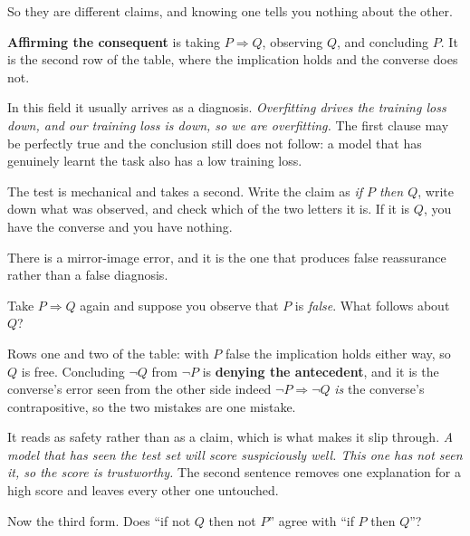 \begin{fr}
So they are different claims, and knowing one tells you nothing about the
other.

\begin{trapbox}
\textbf{Affirming the consequent} is taking $P \Rightarrow Q$, observing $Q$,
and concluding $P$. It is the second row of the table, where the implication
holds and the converse does not.

In this field it usually arrives as a diagnosis. \emph{Overfitting drives the
training loss down, and our training loss is down, so we are overfitting.} The
first clause may be perfectly true and the conclusion still does not follow:
a model that has genuinely learnt the task also has a low training loss.

The test is mechanical and takes a second. Write the claim as
\emph{if $P$ then $Q$}, write down what was observed, and check which of the
two letters it is. If it is $Q$, you have the converse and you have nothing.
\end{trapbox}

There is a mirror-image error, and it is the one that produces false
reassurance rather than a false diagnosis.

Take $P \Rightarrow Q$ again and suppose you observe that $P$ is
\emph{false}. What follows about $Q$?
\nextframe
\end{fr}

\begin{fr}
Rows one and two of the table: with $P$ false the implication holds either
way, so $Q$ is free. Concluding $\lnot Q$ from $\lnot P$ is \textbf{denying
the antecedent}, and it is the converse's error seen from the other side
\dash{} indeed $\lnot P \Rightarrow \lnot Q$ \emph{is} the converse's
contrapositive, so the two mistakes are one mistake.

It reads as safety rather than as a claim, which is what makes it slip
through. \emph{A model that has seen the test set will score suspiciously
well. This one has not seen it, so the score is trustworthy.} The second
sentence removes one explanation for a high score and leaves every other one
untouched.

Now the third form. Does \enquote{if not $Q$ then not $P$} agree with
\enquote{if $P$ then $Q$}?
\dotline
\nextframe
\end{fr}

